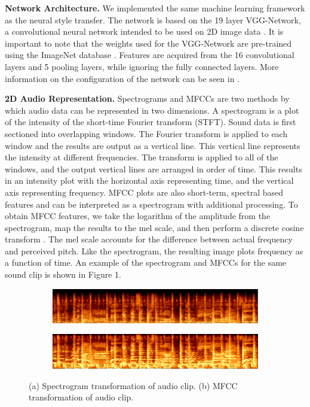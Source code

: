 \documentclass{article}
\begin{document}
\textbf{Network Architecture.} \hspace{0.25cm} We implemented the same machine learning framework as the neural style transfer. The network is based on the 19 layer VGG-Network, a convolutional neural network intended to be used on 2D image data \citep{Simonyan2014}. It is important to note that the weights used for the VGG-Network are pre-trained using the ImageNet database \citep{Russ2014}. Features are acquired from the 16 convolutional layers and 5 pooling layers, while ignoring the fully connected layers. More information on the configuration of the network can be seen in \citep{Gatys2015}.

\textbf{2D Audio Representation.} \hspace{0.25cm} Spectrograms and MFCCs are two methods by which audio data can be represented in two dimensions. A spectrogram is a plot of the intensity of the short-time Fourier transform (STFT). Sound data is first sectioned into overlapping windows. The Fourier transform is applied to each window and the results are output as a vertical line. This vertical line represents the intensity at different frequencies. The transform is applied to all of the windows, and the output vertical lines are arranged in order of time. This results in an intensity plot with the horizontal axis representing time, and the vertical axis representing frequency. MFCC plots are also short-term, spectral based features and can be interpreted as a spectrogram with additional processing. To obtain MFCC features, we take the logarithm of the amplitude from the spectrogram, map the results to the mel scale, and then perform a discrete cosine transform \citep{Logan2000}. The mel scale accounts for the difference between actual frequency and perceived pitch. Like the spectrogram, the resulting image plots frequency as a function of time. An example of the spectrogram and MFCCs for the same sound clip is shown in Figure 1.

\begin{figure}[h]
\begin{subfigure}{\textwidth}
  \centering
  \includegraphics[width = \textwidth]{spec_example}
  \caption{}
\end{subfigure}
 \begin{subfigure}{\textwidth}
  \centering
  \includegraphics[width = \textwidth]{mel_example}
  \caption{}
\end{subfigure}
\caption{(a) Spectrogram transformation of audio clip. (b) MFCC transformation of audio clip.}
\end{figure}
\end{document}
